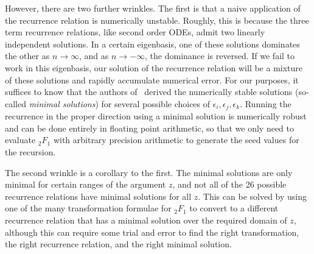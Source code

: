 However, there are two further wrinkles.
The first is that
a naive application of the recurrence relation is numerically unstable.
Roughly, this is because the three term recurrence relations,
like second order ODEs, admit two linearly independent solutions.
In a certain eigenbasis, one of these solutions dominates the other
as $n\rightarrow\infty$, and as $n\rightarrow-\infty$,
the dominance is reversed.
If we fail to work in this eigenbasis, our solution of the recurrence relation
will be a mixture of these solutions and rapidly accumulate numerical error.
For our purposes, it suffices to know that the authors of~\cite{Gil2007}
derived the numerically stable solutions (so-called \textit{minimal solutions})
for several possible choices of $\epsilon_i, \epsilon_j, \epsilon_k$.
Running the recurrence in the proper direction using a minimal solution
is numerically robust and can be done entirely in floating point arithmetic, 
so that we only need to evaluate ${_2F_1}$ with arbitrary precision arithmetic
to generate the seed values for the recursion.

The second wrinkle is a corollary to the first.
The minimal solutions are only minimal for certain ranges of the argument $z$,
and not all of the 26 possible recurrence relations
have minimal solutions for all $z$.
This can be solved by using one of the many transformation formulae for
${_2F_1}$ to convert to a different recurrence relation that has
a minimal solution over the required domain of $z$, although
this can require some trial and error to find the right transformation,
the right recurrence relation, and the right minimal solution.

